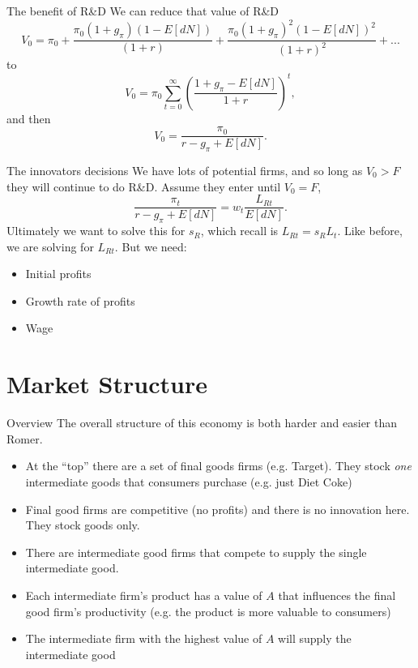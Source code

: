 \begin{frame}{The benefit of R\&D}
We can reduce that value of R\&D
\begin{equation}
	V_0 = \pi_0 + \frac{\pi_0(1+g_{\pi})(1-E[dN])}{(1+r)} + \frac{\pi_0(1+g_{\pi})^2(1-E[dN])^2}{(1+r)^2}+ ... \nonumber
\end{equation}
to 
\begin{equation}
	V_0 = \pi_0 \sum_{t=0}^{\infty} \left(\frac{1+g_{\pi}-E[dN]}{1+r}\right)^{t}, \nonumber
\end{equation}
and then
\begin{equation}
	V_0 = \frac{\pi_0}{r-g_{\pi}+E[dN]}. 
\end{equation}
\end{frame}

\begin{frame}{The innovators decisions}
We have lots of potential firms, and so long as $V_0 > F$ they will continue to do R\&D. Assume they enter until $V_0 = F$,
\begin{equation}
	\frac{\pi_t}{r-g_{\pi}+E[dN]} = w_t \frac{L_{Rt}}{E[dN]}. \nonumber
\end{equation}
Ultimately we want to solve this for $s_R$, which recall is $L_{Rt} = s_R L_t$. Like before, we are solving for $L_{Rt}$. But we need:
\begin{itemize}
	\item Initial profits
	\item Growth rate of profits
	\item Wage
\end{itemize}
\end{frame}

\section{Market Structure}
\begin{frame}{Overview}
The overall structure of this economy is both harder and easier than Romer.
\begin{itemize}
	\item At the ``top'' there are a set of final goods firms (e.g. Target). They stock \textit{one} intermediate goods that consumers purchase (e.g. just Diet Coke) 
	\item Final good firms are competitive (no profits) and there is no innovation here. They stock goods only. 
	\item There are intermediate good firms that compete to supply the single intermediate good.
	\item Each intermediate firm's product has a value of $A$ that influences the final good firm's productivity (e.g. the product is more valuable to consumers)
	\item The intermediate firm with the highest value of $A$ will supply the intermediate good
\end{itemize}
\end{frame}

